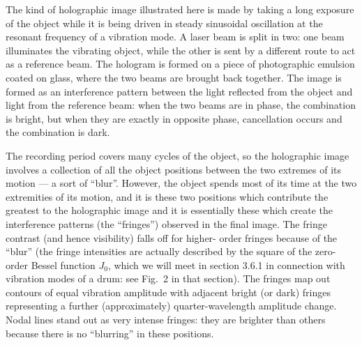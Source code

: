   The kind of holographic image illustrated here is made by taking a long 
  exposure of the object while it is being driven in steady sinusoidal 
  oscillation at the resonant frequency of a vibration mode. A laser beam is 
  split in two: one beam illuminates the vibrating object, while the other is 
  sent by a different route to act as a reference beam. The hologram is formed 
  on a piece of photographic emulsion coated on glass, where the two beams are 
  brought back together. The image is formed as an interference pattern between 
  the light reflected from the object and light from the reference beam: when 
  the two beams are in phase, the combination is bright, but when they are 
  exactly in opposite phase, cancellation occurs and the combination is dark. 

  The recording period covers many cycles of the object, so the holographic 
  image involves a collection of all the object positions between the two 
  extremes of its motion --- a sort of “blur”. However, the object spends most 
  of its time at the two extremities of its motion, and it is these two 
  positions which contribute the greatest to the holographic image and it is 
  essentially these which create the interference patterns (the “fringes”) 
  observed in the final image. The fringe contrast (and hence visibility) falls 
  off for higher- order fringes because of the “blur” (the fringe intensities 
  are actually described by the square of the zero-order Bessel function $J_0$, 
  which we will meet in section 3.6.1 in connection with vibration modes of a 
  drum: see Fig.\ 2 in that section). The fringes map out contours of equal 
  vibration amplitude with adjacent bright (or dark) fringes representing a 
  further (approximately) quarter-wavelength amplitude change. Nodal lines 
  stand out as very intense fringes: they are brighter than others because 
  there is no “blurring” in these positions. 